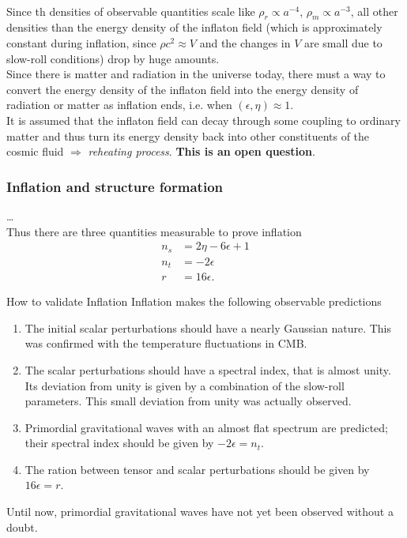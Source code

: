 \\
Since th densities of observable quantities scale like $\rho_r \propto a^{-4}$, $\rho_m \propto a^{-3}$, all other densities than the energy density of the inflaton field (which is approximately constant during inflation, since $\rho c^2 \approx V$ and the changes in $V$ are small due to slow-roll conditions) drop by huge amounts.\\
 Since there is matter and radiation in the universe today, there must a way to convert the energy density of the inflaton field into the energy density of radiation or matter as inflation ends, i.e. when $(\epsilon,\eta)\approx 1$.\\
 It is assumed that the inflaton field can decay through some coupling to ordinary matter and thus turn its energy density back into other constituents of the cosmic fluid $\Rightarrow$ \emph{reheating process}. \textbf{This is an open question}.

\subsubsection{Inflation and structure formation}
\dots
\\
Thus there are three quantities measurable to prove inflation
\begin{align}
	n_s &= 2 \eta - 6 \epsilon +1 \\
	n_t &= -2 \epsilon\\
	r&= 16 \epsilon.
\end{align}
\begin{mybox}{How to validate Inflation}
	Inflation makes the following observable predictions
	\begin{enumerate}
		\item The initial scalar perturbations should have a nearly Gaussian nature. This was confirmed with the temperature fluctuations in CMB.
		\item The scalar perturbations should have a spectral index, that is almost unity. Its deviation from unity is given by a combination of the slow-roll parameters. This small deviation from unity was actually observed.
		\item Primordial gravitational waves with an almost flat spectrum are predicted; their spectral index should be given by $-2 \epsilon = n_t$.
		\item The ration between tensor and scalar perturbations should be given by $16\epsilon =r$.
	\end{enumerate}
Until now, primordial gravitational waves have not yet been observed without a doubt.
\end{mybox}



